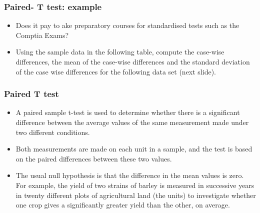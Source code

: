 ﻿

\begin{frame}
\frametitle{Paired- T  test: example}
\begin{itemize}
\item Does it pay to ake preparatory courses for standardised tests such as the Comptia Exams?
\item Using the sample data in the following table, compute the case-wise differences, the mean of the case-wise differences and the standard deviation of the case wise differences for the following data set (next slide).
\end{itemize}
\end{frame}
\begin{frame}
\frametitle{Paired T test}
\begin{itemize} \item A paired sample t-test is used to determine whether there is a significant difference between the average values of the same measurement made under two different conditions. \item Both measurements are made on each unit in a sample, and the test is based on the paired differences between these two values. \item The usual null hypothesis is that the difference in the mean values is zero. For example, the yield of two strains of barley is measured in successive years in twenty different plots of agricultural land (the units) to investigate whether one crop gives a significantly greater yield than the other, on average.
\end{itemize}

\end{frame}

